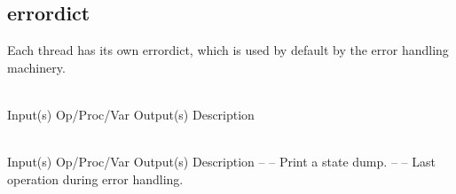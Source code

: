 %
%
%
%
%

\subsection{errordict}
\label{sec:errordict}

Each thread has its own errordict, which is used by default by the error
handling machinery.

\begin{longtable}{}
\caption{errordict summary} \\
\hline
\optableent
	{Input(s)}
	{Op/Proc/Var}
	{Output(s)}
	{Description}
\hline \hline
\endfirsthead
\caption[]{\emph{continued}} \\
\hline
\optableent
	{Input(s)}
	{Op/Proc/Var}
	{Output(s)}
	{Description}
\hline \hline \endhead
{} \endfoot
\hline \endlastfoot
\optableent
	{--}
	{{\bf {}}}
	{--}
	{Print a state dump.}
\hline
\optableent
	{--}
	{{\bf {}}}
	{--}
	{Last operation during error handling.}
\end{longtable}

